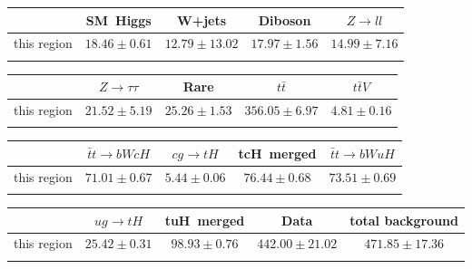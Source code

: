 \centering
\begin{tabular}{ccccc} \toprule\toprule
 & SM~Higgs & W+jets & Diboson & $Z\to ll$\\\midrule
this region & $18.46\pm0.61$ & $12.79\pm13.02$ & $17.97\pm1.56$ & $14.99\pm7.16$\\
\bottomrule\bottomrule\\
\end{tabular}
\begin{tabular}{ccccc} \toprule\toprule
 & $Z\to \tau\tau$ & Rare & $t\bar{t}$ & $t\bar{t}V$\\\midrule
this region & $21.52\pm5.19$ & $25.26\pm1.53$ & $356.05\pm6.97$ & $4.81\pm0.16$\\
\bottomrule\bottomrule\\
\end{tabular}
\begin{tabular}{ccccc} \toprule\toprule
 & $\bar{t}t\to bWcH$ & $cg\to tH$ & tcH~merged & $\bar{t}t\to bWuH$\\\midrule
this region & $71.01\pm0.67$ & $5.44\pm0.06$ & $76.44\pm0.68$ & $73.51\pm0.69$\\
\bottomrule\bottomrule\\
\end{tabular}
\begin{tabular}{ccccc} \toprule\toprule
 & $ug\to tH$ & tuH~merged & Data & total background\\\midrule
this region & $25.42\pm0.31$ & $98.93\pm0.76$ & $442.00\pm21.02$ & $471.85\pm17.36$\\
\bottomrule\bottomrule\\
\end{tabular}
